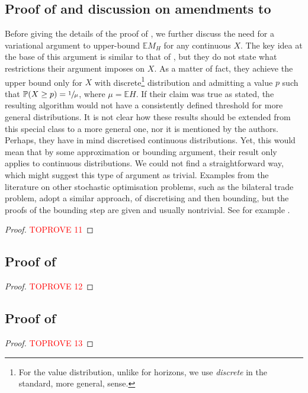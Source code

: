 \documentclass[11pt, a4paper, twoside]{article}
\newcommand{\EE}{\mathbb{E}}
\newcommand{\PP}{\mathbb{P}}
\numberwithin{equation}{section}
\begin{document}
	\subsection{Proof of  and discussion on amendments to \cite{AliBanGolMunWan20}}\label{suppGclassmax}
	Before giving the details of the proof of , we further discuss the need for a variational argument to upper-bound $\EE M_H$ for any continuous $X$. The key idea at the base of this argument is similar to that of \cite[Theorem~3.2]{AliBanGolMunWan20}, but they do not state what restrictions their argument imposes on $X$. As a matter of fact, they achieve the upper bound only for $X$ with discrete\footnote{For the value distribution, unlike for horizons, we use \textit{discrete} in the standard, more general, sense.} distribution and admitting a value $p$ such that $\PP(X\geq p)=\sfrac{1}{\mu}$, where $\mu=\EE H$. If their claim was true as stated, the resulting algorithm would not have a consistently defined threshold for more general distributions. It is not clear how these results should be extended from this special class to a more general one, nor it is mentioned by the authors. Perhaps, they have in mind discretised continuous distributions. Yet, this would mean that by some approximation or bounding argument, their result only applies to continuous distributions. We could not find a straightforward way, which might suggest this type of argument as trivial. Examples from the literature on other stochastic optimisation problems, such as the bilateral trade problem, adopt a similar approach, of discretising and then bounding, but the proofs of the bounding step are given and usually nontrivial. See for example \cite{CaiWu23}.
    \begin{proof}\textcolor{red}{TOPROVE 11}\end{proof}

	\subsection{Proof of }\label{suppGclassalgran}
	\begin{proof}\textcolor{red}{TOPROVE 12}\end{proof}
	
	\subsection{Proof of }\label{suppGclassGhorizon}
	\begin{proof}\textcolor{red}{TOPROVE 13}\end{proof}
	
\end{document}
